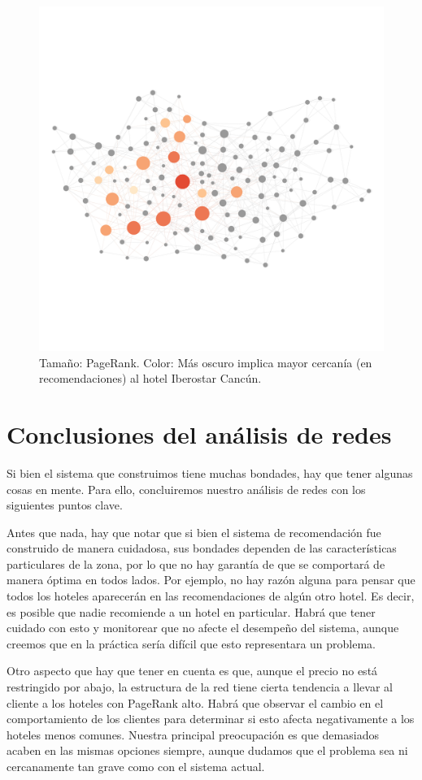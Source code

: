 \documentclass[12pt]{report}
\begin{document}
\begin{figure}[ht]
	\includegraphics[height=0.75\textwidth, angle=90,
		trim = 100 900 100 900, clip]{imagenes/cancun_iberostar2.png}
	\caption{\label{fig:cancun_iberostar} Tamaño: PageRank. Color: Más oscuro implica mayor cercanía (en recomendaciones) al hotel Iberostar Cancún.}
\end{figure}

\section{Conclusiones del análisis de redes}

Si bien el sistema que construimos tiene muchas bondades, hay que tener algunas cosas en mente. Para ello, concluiremos nuestro análisis de redes con los siguientes puntos clave.

Antes que nada, hay que notar que si bien el sistema de recomendación fue construido de manera cuidadosa, sus bondades dependen de las características particulares de la zona, por lo que no hay garantía de que se comportará de manera óptima en todos lados. Por ejemplo, no hay razón alguna para pensar que todos los hoteles aparecerán en las recomendaciones de algún otro hotel. Es decir, es posible que nadie recomiende a un hotel en particular. Habrá que tener cuidado con esto y monitorear que no afecte el desempeño del sistema, aunque creemos que en la práctica sería difícil que esto representara un problema.

Otro aspecto que hay que tener en cuenta es que, aunque el precio no está restringido por abajo, la estructura de la red tiene cierta tendencia a llevar al cliente a los hoteles con PageRank alto. Habrá que observar el cambio en el comportamiento de los clientes para determinar si esto afecta negativamente a los hoteles menos comunes. Nuestra principal preocupación es que demasiados acaben en las mismas opciones siempre, aunque dudamos que el problema sea ni cercanamente tan grave como con el sistema actual.
\end{document}
